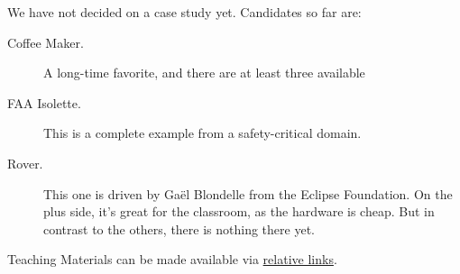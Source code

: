 We have not decided on a case study yet.  Candidates so far are:

\begin{description}
\item[Coffee Maker.] A long-time favorite, and there are at least three available
\item[FAA Isolette.] This is a complete example from a safety-critical domain. 
\item[Rover.] This one is driven by Gaël Blondelle from the Eclipse Foundation. On the plus side, it's great for the classroom, as the hardware is cheap. But in contrast to the others, there is nothing there yet. 
\end{description}

Teaching Materials can be made available via \href{../se-materials/Example.reqif}{relative links}.
